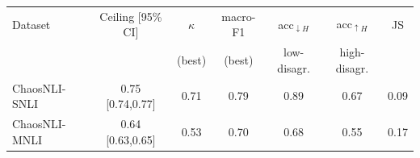 \begin{tabular}{@{}l c c c c c c@{}}
\toprule
Dataset & Ceiling [95\% CI] & $\kappa$ & macro-F1 & acc$_{\downarrow H}$ & acc$_{\uparrow H}$ & JS \\
 & & (best) & (best) & low-disagr. & high-disagr. & \\
\midrule
ChaosNLI-SNLI & 0.75 [0.74,0.77] & 0.71 & 0.79 & 0.89 & 0.67 & 0.09 \\
ChaosNLI-MNLI & 0.64 [0.63,0.65] & 0.53 & 0.70 & 0.68 & 0.55 & 0.17 \\
\bottomrule
\end{tabular}